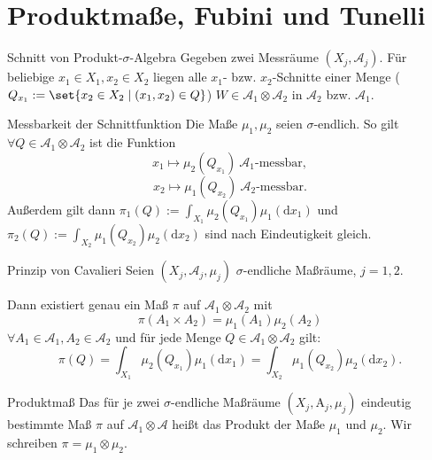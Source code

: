 \section*{Produktmaße, Fubini und Tunelli}

\begin{karte}{Schnitt von Produkt-\(\sigma\)-Algebra}
    Gegeben zwei Messräume \( (X_j,\mathcal{A}_j) \).
    Für beliebige \( x_1 \in X_1, x_2 \in X_2 \) 
    liegen alle \(x_1\)- bzw. \(x_2\)-Schnitte einer Menge 
    (\( Q_{x_1} := \set{x_2 \in X_2 \;|\; (x_1,x_2)\in Q} \))
    \( W \in \mathcal{A}_1 \otimes \mathcal{A}_2 \) 
    in \(\mathcal{A}_2\) bzw. \( \mathcal{A}_1 \).
\end{karte}

\begin{karte}{Messbarkeit der Schnittfunktion}
    Die Maße \( \mu_1, \mu_2 \) seien \( \sigma \)-endlich. 
    So gilt \( \forall Q \in \mathcal{A}_1 \otimes \mathcal{A}_2 \) 
    ist die Funktion 
    \[ x_1 \mapsto \mu_2(Q_{x_1}) \ \mathcal{A}_1\text{-messbar}, \]
    \[ x_2 \mapsto \mu_1(Q_{x_2}) \ \mathcal{A}_2\text{-messbar}. \]
    Außerdem gilt dann 
    \( \pi_1(Q) := \int_{X_1} \mu_2(Q_{x_1}) \mu_1(\mathrm{d}x_1) \)
    und \\
    \( \pi_2(Q) := \int_{X_2} \mu_1(Q_{x_2}) \mu_2(\mathrm{d}x_2) \)
    sind nach Eindeutigkeit gleich.
\end{karte}

\begin{karte}{Prinzip von Cavalieri}
    Seien \( (X_j, \mathcal{A}_j, \mu_j) \) \(\sigma\)-endliche Maßräume, \(j=1,2\).
    
    Dann existiert genau ein Maß \(\pi\) auf \( \mathcal{A}_1 \otimes \mathcal{A}_2 \) 
    mit 
    \[ \pi(A_1 \times A_2) = \mu_1(A_1) \mu_2(A_2) \]
    \( \forall A_1\in \mathcal{A}_1, A_2 \in \mathcal{A}_2 \) und 
    für jede Menge \(Q \in \mathcal{A}_1 \otimes \mathcal{A}_2\) gilt:
    \[ \pi(Q) = \int_{X_1} \mu_2(Q_{x_1}) \mu_1(\mathrm{d}x_1) 
    = \int_{X_2} \mu_1(Q_{x_2}) \mu_2(\mathrm{d}x_2). \]
\end{karte}

\begin{karte}{Produktmaß}
    Das für je zwei \(\sigma\)-endliche Maßräume \( ( X_j, \mathrm{A}_j, \mu_j ) \)
    eindeutig bestimmte Maß \( \pi \) auf \( \mathcal{A}_1 \otimes \mathcal{A} \)
    heißt das Produkt der Maße \( \mu_1 \) und \( \mu_2 \). Wir schreiben \( \pi = \mu_1 \otimes \mu_2 \).
\end{karte}

